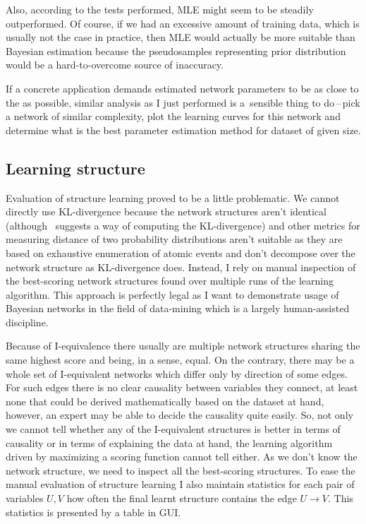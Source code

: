 \documentclass[english,cover]{fitthesis} %
\newcommand{\todo}[1]{{\color{red}#1}}
\begin{document}
Also, according to the tests performed, MLE might seem to be steadily outperformed. Of course, if we had an excessive amount of training data, which is usually not the case in practice, then MLE would actually be more suitable than Bayesian estimation because the pseudosamples representing prior distribution would be a hard-to-overcome source of inaccuracy.

If a concrete application demands estimated network parameters to be as close to the  as possible, similar analysis as I just performed is a~sensible thing to do\,--\,pick a network of similar complexity, plot the learning curves for this network and determine what is the best parameter estimation method for dataset of given size.



\subsection{Learning structure}
Evaluation of structure learning proved to be a little problematic. We cannot directly use KL-divergence because the network structures aren't identical (although~\cite{heckerman95_learning} suggests a way of computing the KL-divergence) and other metrics for measuring distance of two probability distributions aren't suitable as they are based on exhaustive enumeration of atomic events and don't decompose over the network structure as KL-divergence does. Instead, I rely on manual inspection of the best-scoring network structures found over multiple runs of the learning algorithm. This approach is perfectly legal as I want to demonstrate usage of Bayesian networks in the field of data-mining which is a largely human-assisted discipline.

Because of I-equivalence there usually are multiple network structures sharing the same highest score and being, in a sense, equal. On the contrary, there may be a whole set of I-equivalent networks which differ only by direction of some edges. For such edges there is no clear causality between variables they connect, at least none that could be derived mathematically based on the dataset at hand, however, an expert may be able to decide the causality quite easily. So, not only we cannot tell whether any of the I-equivalent structures is better in terms of causality or in terms of explaining the data at hand, the learning algorithm driven by maximizing a scoring function cannot tell either. As we don't know the  network structure, we need to inspect all the best-scoring structures. To ease the manual evaluation of structure learning I also maintain statistics for each pair of variables $U, V$ how often the final learnt structure contains the edge $U \rightarrow V$. This statistics is presented by a table in GUI.
\end{document}
